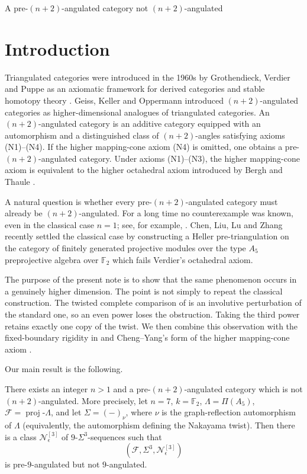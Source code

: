 \documentclass[12pt, twoside]{article}
\numberwithin{equation}{section}
\begin{document}
\pagestyle{myheadings}
%
         {\scriptsize A pre-$(n+2)$-angulated category not $(n+2)$-angulated}



\section{Introduction}

Triangulated categories were introduced in the 1960s by Grothendieck, Verdier and Puppe as an axiomatic framework for derived categories and stable homotopy theory \cite{H,P,V}. Geiss, Keller and Oppermann \cite{GKO} introduced $(n+2)$-angulated categories as higher-dimensional analogues of triangulated categories. An $(n+2)$-angulated category is an additive category equipped with an automorphism and a distinguished class of $(n+2)$-angles satisfying axioms (N1)--(N4). If the higher mapping-cone axiom (N4) is omitted, one obtains a pre-$(n+2)$-angulated category. Under axioms (N1)--(N3), the higher mapping-cone axiom is equivalent to the higher octahedral axiom introduced by Bergh and Thaule \cite{bt2}.



A natural question is whether every pre-$(n+2)$-angulated category must already be $(n+2)$-angulated. For a long time no counterexample was known, even in the classical case $n=1$; see, for example, \cite[Remark 2.1.5]{JM}. Chen, Liu, Lu and Zhang \cite{CLLZ} recently settled the classical case by constructing a Heller pre-triangulation on the category of finitely generated projective modules over the type $A_5$ preprojective algebra over $\mathbb F_2$ which fails Verdier's octahedral axiom.

The purpose of the present note is to show that the same phenomenon occurs in a genuinely higher dimension. The point is not simply to repeat the classical construction. The twisted complete comparison of \cite{CLLZ} is an involutive perturbation of the standard one, so an even power loses the obstruction. Taking the third power retains exactly one copy of the twist. We then combine this observation with the fixed-boundary rigidity in \cite{CLLZ} and Cheng--Yang's form of the higher mapping-cone axiom \cite{CY}.
\vspace{2mm}

Our main result is the following.

\begin{theorem}\label{HHZ}\rm
There exists an integer $n>1$ and a pre-$(n+2)$-angulated category which is not $(n+2)$-angulated. More precisely, let $n=7$, $k=\mathbb F_2$, $\Lambda=\Pi(A_5)$, $\mathcal F=\operatorname{proj}\text{-}\Lambda$, and let $\Sigma=(-)_\nu$, where $\nu$ is the graph-reflection automorphism of $\Lambda$ (equivalently, the automorphism defining the Nakayama twist). Then there is a class $\mathcal N_{\epsilon}^{[3]}$ of $9$-$\Sigma^3$-sequences such that
\[
(\mathcal F,\Sigma^3,\mathcal N_{\epsilon}^{[3]})
\]
is pre-$9$-angulated but not $9$-angulated.
\end{theorem}
\end{document}
